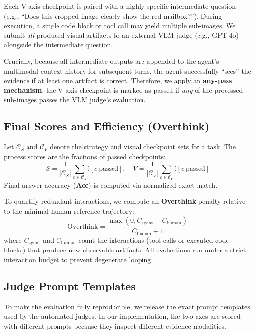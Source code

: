 \documentclass[runningheads]{llncs}
\theoremstyle{plain}
\theoremstyle{definition}
\theoremstyle{remark}
\begin{document}
Each V-axis checkpoint is paired with a highly specific intermediate question (e.g., ``Does this cropped image clearly show the red mailbox?''). During execution, a single code block or tool call may yield multiple sub-images. We submit \emph{all} produced visual artifacts to an external VLM judge (e.g., GPT-4o) alongside the intermediate question. 

Crucially, because all intermediate outputs are appended to the agent's multimodal context history for subsequent turns, the agent successfully ``sees'' the evidence if at least one artifact is correct. Therefore, we apply an \textbf{any-pass mechanism}: the V-axis checkpoint is marked as passed if \emph{any} of the processed sub-images passes the VLM judge's evaluation.

\subsection{Final Scores and Efficiency (Overthink)}
Let $\mathcal{C}_S$ and $\mathcal{C}_V$ denote the strategy and visual checkpoint sets for a task. The process scores are the fractions of passed checkpoints:
\begin{equation}
    S = \frac{1}{|\mathcal{C}_S|}\sum_{c\in\mathcal{C}_S}\mathbb{I}[c\ \text{passed}], \quad V = \frac{1}{|\mathcal{C}_V|}\sum_{c\in\mathcal{C}_V}\mathbb{I}[c\ \text{passed}]
\end{equation}
Final answer accuracy (\textbf{Acc}) is computed via normalized exact match.

To quantify redundant interactions, we compute an \textbf{Overthink} penalty relative to the minimal human reference trajectory:
\begin{equation}
    \text{Overthink}=\frac{\max(0, C_{\text{agent}}-C_{\text{human}})}{C_{\text{human}}+1}
\end{equation}
where $C_{\text{agent}}$ and $C_{\text{human}}$ count the interactions (tool calls or executed code blocks) that produce new observable artifacts. All evaluations run under a strict interaction budget to prevent degenerate looping.

\subsection{Judge Prompt Templates}
\label{app:judge_prompts}

To make the evaluation fully reproducible, we release the exact prompt templates used by the automated judges. In our implementation, the two axes are scored with different prompts because they inspect different evidence modalities.
\end{document}
